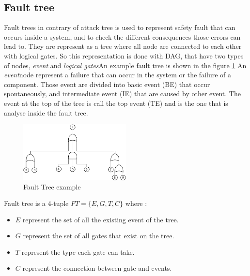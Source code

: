 \subsection{Fault tree}

Fault trees in contrary of attack tree is used to represent safety
fault that can occurs inside a system, and to check the different
consequences those errors can lead to. They are represent as a tree
where all node are connected to each other with logical gates. So this
representation is done with DAG, that have two types of nodes, \emph{event}
and \emph{logical gates}An example fault tree is shown in the figure
\ref{fault}\newline
An \emph{event}node represent a failure that can occur in the system or
the failure of a component. Those event are divided into basic event
(BE) that occur spontaneously, and intermediate event (IE) that are
caused by other event. The event at the top of the tree is call the
top event (TE) and is the one that is analyse inside the fault tree.

\begin{figure}[h]
    \centering
	\includegraphics[width=0.5\textwidth]{schema/fault_tree.pdf}
    \caption{Fault Tree example}
    \label{fault}
\end{figure}


Fault tree is a 4-tuple $FT = \{E, G, T, C\}$ where :

\begin{itemize}

\item $E$ represent the set of all the existing event of the tree.
  
\item $G$ represent the set of all gates that exist on the tree.
  
\item $T$ represent the type each gate can take.

\item $C$ represent the connection between gate and events.

\end{itemize}
    
